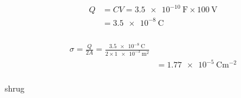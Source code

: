 \subsubsection{}
\begin{align*}
    Q & = CV = \SI{3.5e-10}{\farad} \times \SI{100}{\volt}\\
    & = \SI{3.5e-8}{\coulomb}
\end{align*}

\subsubsection{}
\begin{align*}
    \sigma = \frac{Q}{2A} = \frac{\SI{3.5e-8}{\coulomb}}{2 \times \SI{1e-3}{\metre\tothe{2}}}\\
    & = \SI{1.77e-5}{\coulomb\metre\tothe{-2}}
\end{align*}

\subsubsection{}
shrug
